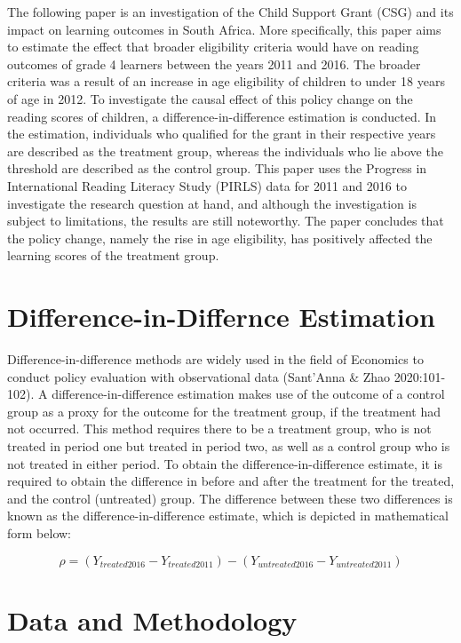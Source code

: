 \documentclass[11pt,preprint, authoryear]{elsarticle}
\numberwithin{equation}{section}
\numberwithin{figure}{section}
\numberwithin{table}{section}
\begin{document}
The following paper is an investigation of the Child Support Grant (CSG)
and its impact on learning outcomes in South Africa. More specifically,
this paper aims to estimate the effect that broader eligibility criteria
would have on reading outcomes of grade 4 learners between the years
2011 and 2016. The broader criteria was a result of an increase in age
eligibility of children to under 18 years of age in 2012. To investigate
the causal effect of this policy change on the reading scores of
children, a difference-in-difference estimation is conducted. In the
estimation, individuals who qualified for the grant in their respective
years are described as the treatment group, whereas the individuals who
lie above the threshold are described as the control group. This paper
uses the Progress in International Reading Literacy Study (PIRLS) data
for 2011 and 2016 to investigate the research question at hand, and
although the investigation is subject to limitations, the results are
still noteworthy. The paper concludes that the policy change, namely the
rise in age eligibility, has positively affected the learning scores of
the treatment group.

\hypertarget{difference-in-differnce-estimation}{%
\section{Difference-in-Differnce
Estimation}\label{difference-in-differnce-estimation}}

Difference-in-difference methods are widely used in the field of
Economics to conduct policy evaluation with observational data
(Sant'Anna \& Zhao 2020:101-102). A difference-in-difference estimation
makes use of the outcome of a control group as a proxy for the outcome
for the treatment group, if the treatment had not occurred. This method
requires there to be a treatment group, who is not treated in period one
but treated in period two, as well as a control group who is not treated
in either period. To obtain the difference-in-difference estimate, it is
required to obtain the difference in before and after the treatment for
the treated, and the control (untreated) group. The difference between
these two differences is known as the difference-in-difference estimate,
which is depicted in mathematical form below:

\[ \rho = (Y_{treated2016} - Y_{treated2011}) - (Y_{untreated2016} - Y_{untreated2011})\]

\hypertarget{data-and-methodology}{%
\section{Data and Methodology}\label{data-and-methodology}}
\end{document}
